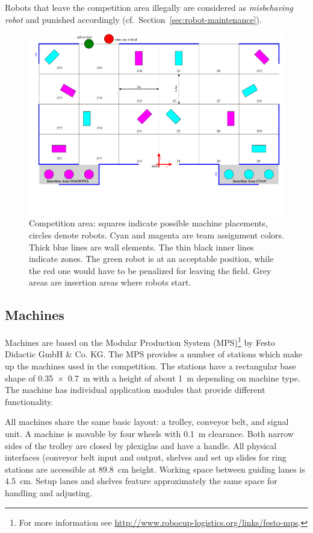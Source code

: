 \documentclass[12pt,twoside]{article}
\newcommand{\refsec}[1]{Section~\ref{#1}}
\begin{document}
Robots that leave the competition area illegally are considered as
\emph{misbehaving robot} and punished accordingly
(cf.~\refsec{sec:robot-maintenance}).

\begin{figure}
  \includegraphics[angle=-90 , trim = 30 80 20 0,
  scale=0.8]{field.pdf}
  \vspace{1ex}
  \caption{Competition area: squares indicate possible machine
    placements, circles denote robots. Cyan and magenta are team
    assignment colors. Thick blue lines are wall elements. The thin
    black inner lines indicate zones. The green robot is at an
    acceptable position, while the red one would have to be penalized
    for leaving the field. Grey areas are insertion areas where robots
    start.}
  \label{fig:competition-area}
\end{figure}

\subsection{Machines}
\label{sec:machines}
Machines are based on the Modular Production System (MPS)\footnote{For
  more information see
  \url{http://www.robocup-logistics.org/links/festo-mps}.} by Festo
Didactic GmbH \& Co. KG. The MPS provides a number of stations which
make up the machines used in the competition. The stations have a
rectangular base shape of \SI{0,35 x 0,7}{\metre} with a height of
about \SI{1}{\metre} depending on machine type. The machine
has individual application modules that provide different
functionality.

All machines share the same basic layout: a trolley, conveyor belt,
and signal unit. A machine is movable by four wheels with
\SI{0.1}{\metre} clearance. Both narrow sides of the trolley are
closed by plexiglas and have a handle. All physical interfaces
(conveyor belt input and output, shelves and set up slides for ring
stations are accessible at \SI{89.8}{\centi\metre} height. Working
space between guiding lanes is \SI{4.5}{\centi\metre}. Setup lanes and
shelves feature approximately the same space for handling and
adjusting.
\end{document}
